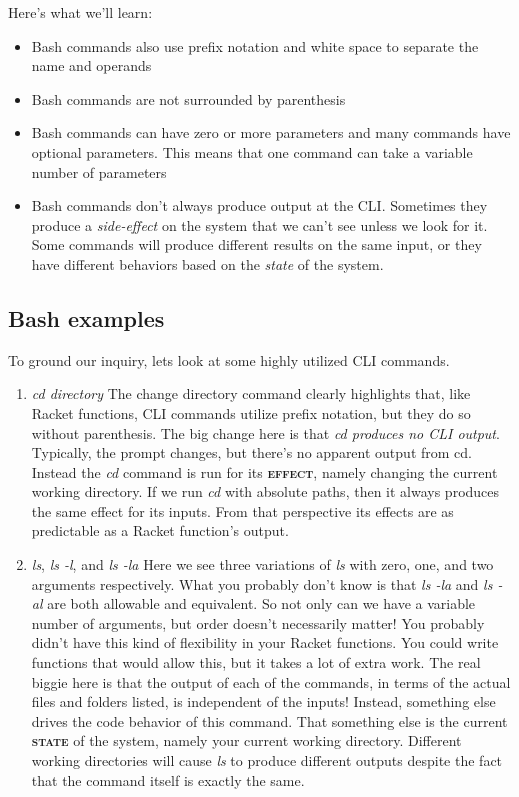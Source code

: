 \documentclass[]{tufte-handout}
\begin{document}
Here's what we'll learn:
\begin{itemize}
\item Bash commands also use prefix notation and white space to separate the name and operands
\item Bash commands are not surrounded by parenthesis
\item Bash commands can have zero or more parameters and many commands have optional parameters. This means that one command can take a variable number of parameters
\item Bash commands don't always produce output at the CLI. Sometimes they produce a \textit{side-effect} on the system that we can't see unless we look for it.  Some commands will produce different results on the same input, or they have different behaviors based on the \textit{state} of the system.
\end{itemize}

\subsection{Bash examples}

To ground our inquiry, lets look at some highly utilized CLI commands.
\begin{enumerate}
\item \textit{cd \textit{directory}} \newline
The change directory command clearly highlights that, like Racket functions, CLI commands utilize prefix notation, but they do so without parenthesis. The big change here is that \textit{cd produces no CLI output}.  Typically, the prompt changes, but there's no apparent output from cd. Instead the \textit{cd} command is run for its \textsc{\textbf{effect}}, namely changing the current working directory.  If we run \textit{cd} with absolute paths, then it always produces the same effect for its inputs. From that perspective its effects are as predictable as a Racket function's output.

\item \textit{ls}, \textit{ls -l}, and \textit{ls -la} \newline
Here we see three variations of \textit{ls} with zero, one, and two arguments respectively.  What you probably don't know is that \textit{ls -la} and \textit{ls -al}  are both allowable and equivalent. So not only can we have a variable number of arguments, but order doesn't necessarily matter! You probably didn't have this kind of flexibility in your Racket functions.  You could write functions that would allow this, but it takes a lot of extra work. The real biggie here is that the output of each of the commands, in terms of the actual files and folders listed, is independent of the inputs!   Instead, something else drives the code behavior of this command. That something else is the current \textbf{\textsc{state}} of the system, namely your current working directory. Different working directories will cause \textit{ls} to produce different outputs despite the fact that the command itself is exactly the same. 

\end{enumerate}
\end{document}
